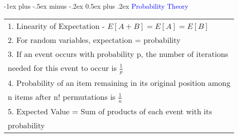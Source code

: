 \documentclass[10pt,landscape]{article}
\makeatletter
\renewcommand{\section}{\@startsection{section}{1}{0mm}%
                                {-1ex plus -.5ex minus -.2ex}%
                                {0.5ex plus .2ex}%
                                {\normalfont\large\bfseries}}
\makeatother
\begin{document}
\begin{multicols}{3}
\section{\textcolor{blue}{Probability Theory}} 
\begin{tabular}{l}
1. Linearity of Expectation - $E[A + B] = E[A] = E[B]$ \\
2. For random variables, expectation = probability \\ 
3. If an event occurs with probability p, the number of iterations \\ needed for this event to occur is $\frac{1}{p}$ \\
4. Probability of an item remaining in its original position among \\ n items after n! permutations is $\frac{1}{n}$ \\ 
5. Expected Value = Sum of products of each event with its \\ probability 
\end{tabular}

\newpage
\end{multicols}
\end{document}
